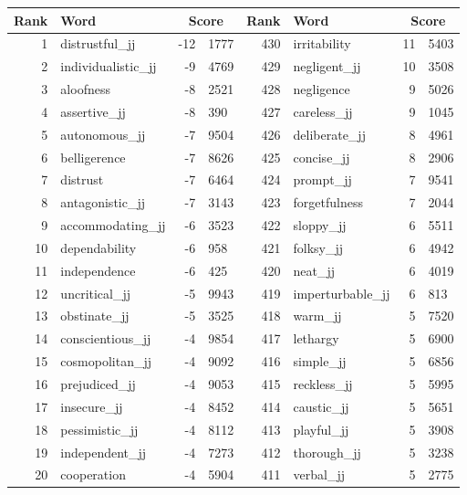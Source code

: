 \begin{table}[tbp]
    \begin{tabular}{| rlr@{.}l | rlr@{.}l |}
    \hline
    \textbf{Rank} & \textbf{Word} & \multicolumn{2}{c|}{\textbf{Score}} & \textbf{Rank} & \textbf{Word} & \multicolumn{2}{c|}{\textbf{Score}} \\
    \hline
    1 & distrustful\_jj & -12 & 1777    &    430 & irritability & 11 & 5403 \\
    2 & individualistic\_jj & -9 & 4769    &    429 & negligent\_jj & 10 & 3508 \\
    3 & aloofness & -8 & 2521    &    428 & negligence & 9 & 5026 \\
    4 & assertive\_jj & -8 & 390    &    427 & careless\_jj & 9 & 1045 \\
    5 & autonomous\_jj & -7 & 9504    &    426 & deliberate\_jj & 8 & 4961 \\
    6 & belligerence & -7 & 8626    &    425 & concise\_jj & 8 & 2906 \\
    7 & distrust & -7 & 6464    &    424 & prompt\_jj & 7 & 9541 \\
    8 & antagonistic\_jj & -7 & 3143    &    423 & forgetfulness & 7 & 2044 \\
    9 & accommodating\_jj & -6 & 3523    &    422 & sloppy\_jj & 6 & 5511 \\
    10 & dependability & -6 & 958    &    421 & folksy\_jj & 6 & 4942 \\
    11 & independence & -6 & 425    &    420 & neat\_jj & 6 & 4019 \\
    12 & uncritical\_jj & -5 & 9943    &    419 & imperturbable\_jj & 6 & 813 \\
    13 & obstinate\_jj & -5 & 3525    &    418 & warm\_jj & 5 & 7520 \\
    14 & conscientious\_jj & -4 & 9854    &    417 & lethargy & 5 & 6900 \\
    15 & cosmopolitan\_jj & -4 & 9092    &    416 & simple\_jj & 5 & 6856 \\
    16 & prejudiced\_jj & -4 & 9053    &    415 & reckless\_jj & 5 & 5995 \\
    17 & insecure\_jj & -4 & 8452    &    414 & caustic\_jj & 5 & 5651 \\
    18 & pessimistic\_jj & -4 & 8112    &    413 & playful\_jj & 5 & 3908 \\
    19 & independent\_jj & -4 & 7273    &    412 & thorough\_jj & 5 & 3238 \\
    20 & cooperation & -4 & 5904    &    411 & verbal\_jj & 5 & 2775 \\

\end{tabular}
\end{table}
